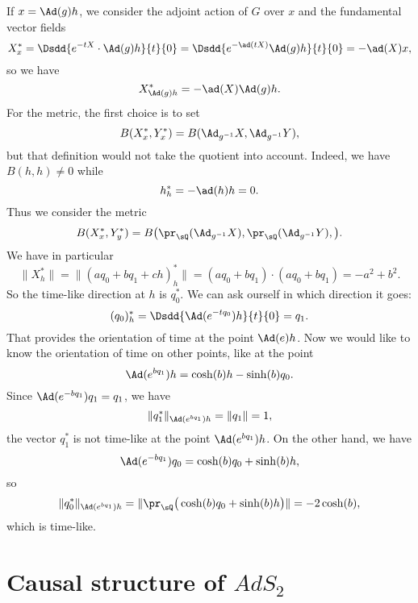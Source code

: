 If $x=\Ad(g)h$, we consider the adjoint action of $G$ over $x$ and the fundamental vector fields
\begin{equation}
	X^*_x=\Dsdd{  e^{-tX}\cdot\Ad(g)h }{t}{0}=\Dsdd{  e^{-\ad(tX)}\Ad(g)h }{t}{0}=-\ad(X)x,
\end{equation}
so we have
\begin{equation}
	X^*_{\Ad(g)h}=-\ad(X)\Ad(g)h.
\end{equation}
For the metric, the first choice is to set
\begin{equation}
	B(X^*_x,Y^*_x)=B(\Ad_{g^{-1}}X,\Ad_{g^{-1}}Y),
\end{equation}
but that definition would not take the quotient into account. Indeed, we have $B(h,h)\neq 0$ while
\begin{equation}
	h^*_h=-\ad(h)h=0.
\end{equation}
Thus we consider the metric
\begin{equation}
	B(X^*_x,Y^*_y)=B\big( \pr_{\sQ}(\Ad_{g^{-1}}X ),\pr_{\sQ}(\Ad_{g^{-1}}Y ), \big).
\end{equation}
We have in particular
\begin{equation}
	\| X_h^* \|=\| (aq_0+bq_1+ch)_h^* \|=(aq_0+bq_1)\cdot(aq_0+bq_1)=-a^2+b^2.
\end{equation}
So the time-like direction at $h$ is $q_0^*$. We can ask ourself in which direction it goes:
\begin{equation}
	(q_0)^*_h=\Dsdd{ \Ad( e^{-tq_0})h }{t}{0}=q_1.
\end{equation}
That provides the orientation of time at the point $\Ad(e)h$. Now we would like to know the orientation of time on other points, like at the point
\begin{equation}
	\Ad( e^{bq_1})h=\cosh(b)h-\sinh(b)q_0.
\end{equation}
Since $\Ad( e^{-bq_1})q_1=q_1$, we have
\begin{equation}
	\| q_1^* \|_{\Ad( e^{bq_1})h}=\| q_1 \|=1,
\end{equation}
the vector $q_1^*$ is not time-like at the point $\Ad( e^{bq_1})h$. On the other hand, we have
\begin{equation}
	\Ad( e^{-bq_1})q_0=\cosh(b)q_0+\sinh(b)h,
\end{equation}
so
\begin{equation}
	\| q_0^* \|_{\Ad( e^{bq_1})h}=\| \pr_{\sQ}\big( \cosh(b)q_0+\sinh(b)h \big) \|=-2\cosh(b),
\end{equation}
which is time-like.

\section{Causal structure of \texorpdfstring{$AdS_2$}{AdS2}}  \label{SecAdS2}

